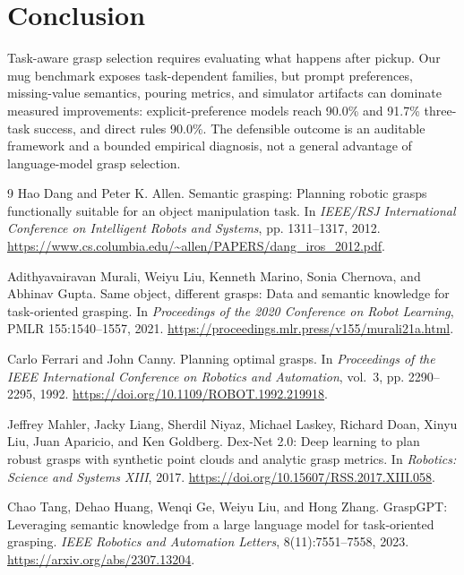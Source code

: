 \documentclass{article}
\begin{document}
\section{Conclusion}
Task-aware grasp selection requires evaluating what happens after pickup. Our mug benchmark exposes task-dependent families, but prompt preferences, missing-value semantics, pouring metrics, and simulator artifacts can dominate measured improvements: explicit-preference models reach 90.0\% and 91.7\% three-task success, and direct rules 90.0\%. The defensible outcome is an auditable framework and a bounded empirical diagnosis, not a general advantage of language-model grasp selection.

\clearpage
\begin{thebibliography}{9}
Hao Dang and Peter K. Allen.
Semantic grasping: Planning robotic grasps functionally suitable for an object manipulation task.
In \emph{IEEE/RSJ International Conference on Intelligent Robots and Systems}, pp. 1311--1317, 2012.
\url{https://www.cs.columbia.edu/~allen/PAPERS/dang_iros_2012.pdf}.

Adithyavairavan Murali, Weiyu Liu, Kenneth Marino, Sonia Chernova, and Abhinav Gupta.
Same object, different grasps: Data and semantic knowledge for task-oriented grasping.
In \emph{Proceedings of the 2020 Conference on Robot Learning}, PMLR 155:1540--1557, 2021.
\url{https://proceedings.mlr.press/v155/murali21a.html}.

Carlo Ferrari and John Canny.
Planning optimal grasps.
In \emph{Proceedings of the IEEE International Conference on Robotics and Automation}, vol.~3, pp. 2290--2295, 1992.
\url{https://doi.org/10.1109/ROBOT.1992.219918}.

Jeffrey Mahler, Jacky Liang, Sherdil Niyaz, Michael Laskey, Richard Doan, Xinyu Liu, Juan Aparicio, and Ken Goldberg.
Dex-Net 2.0: Deep learning to plan robust grasps with synthetic point clouds and analytic grasp metrics.
In \emph{Robotics: Science and Systems XIII}, 2017.
\url{https://doi.org/10.15607/RSS.2017.XIII.058}.

Chao Tang, Dehao Huang, Wenqi Ge, Weiyu Liu, and Hong Zhang.
GraspGPT: Leveraging semantic knowledge from a large language model for task-oriented grasping.
\emph{IEEE Robotics and Automation Letters}, 8(11):7551--7558, 2023.
\url{https://arxiv.org/abs/2307.13204}.


\end{thebibliography}
\end{document}
